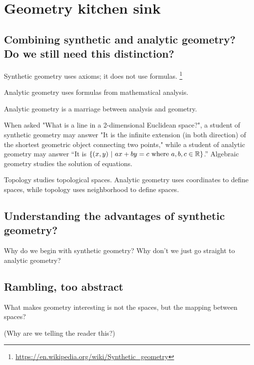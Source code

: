\chapter{Geometry kitchen sink}
\label{chp:geometry}

\section{Combining synthetic and analytic geometry? Do we still need this distinction?}

Synthetic geometry uses axioms; it does not use formulas.%
\footnote{\url{https://en.wikipedia.org/wiki/Synthetic_geometry}}

Analytic geometry uses formulas from mathematical analysis.

Analytic geometry is a marriage between analysis and geometry.

When asked "What is a line in a 2-dimensional Euclidean space?",
a student of
synthetic geometry
may answer "It is the infinite extension (in both direction)
of the shortest geometric object connecting two points,"
while a student of
analytic geometry
may answer
``It is $\{ (x,y) ~|~ ax+by=c \text{ where } a,b,c\in\mathbb{R} \}$.''
Algebraic geometry studies the solution of equations.

Topology studies topological spaces.
Analytic geometry uses coordinates to define spaces,
while topology uses neighborhood to define spaces.

\section{Understanding the advantages of synthetic geometry?}

Why do we begin with synthetic geometry?
Why don't we just go straight to analytic geometry?

\section{Rambling, too abstract}

What makes geometry interesting is not the spaces,
but the mapping between spaces?

(Why are we telling the reader this?)

